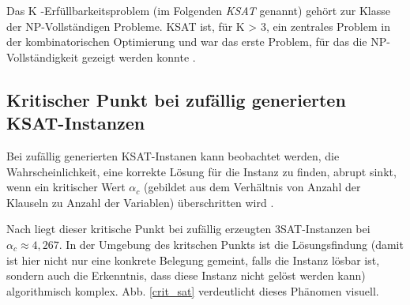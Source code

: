 Das K -Erfüllbarkeitsproblem (im Folgenden\emph{ KSAT} genannt) gehört zur Klasse der NP-Vollständigen Probleme. KSAT ist, für K > 3, ein zentrales Problem in der kombinatorischen Optimierung und war das erste Problem, für das die NP-Vollständigkeit gezeigt werden konnte \cite{mezard2002random}.

%

\subsection{Kritischer Punkt bei zufällig generierten KSAT-Instanzen}\label{krit:sat}
Bei zufällig generierten KSAT-Instanen kann beobachtet werden, die Wahrscheinlichkeit, eine korrekte Lösung für die Instanz zu finden, abrupt sinkt, wenn ein kritischer Wert $\alpha_{c}$ (gebildet aus dem Verhältnis von Anzahl der Klauseln zu Anzahl der Variablen) überschritten wird \cite{monasson1996entropy}.

Nach \cite{mezard2002random} liegt dieser kritische Punkt bei zufällig erzeugten 3SAT-Instanzen bei \\$\alpha_{c} \approx 4,267$. In der Umgebung des kritschen Punkts ist die Lösungsfindung (damit ist hier nicht nur eine konkrete Belegung gemeint, falls die Instanz lösbar ist, sondern auch die Erkenntnis, dass diese Instanz nicht gelöst werden kann) algorithmisch komplex. Abb. \ref{crit_sat} verdeutlicht dieses Phänomen visuell.

